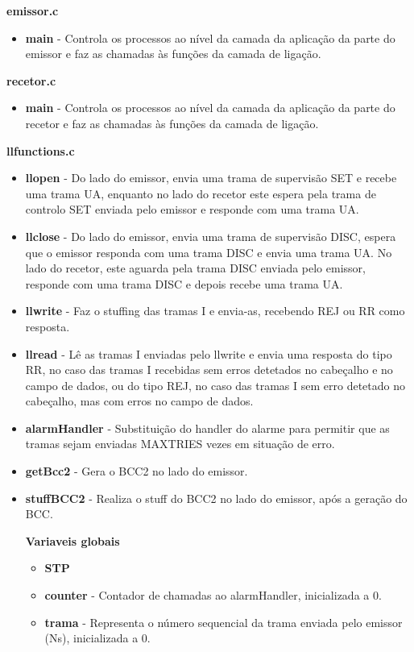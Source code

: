 \documentclass{article}
\begin{document}
\bigskip

\textbf{emissor.c}
\begin{itemize}
	\item \textbf{main} - Controla os processos ao nível da camada da aplicação da parte do emissor e faz as chamadas às funções da camada de ligação.
\end{itemize}


\bigskip

\textbf{recetor.c}
\begin{itemize}
	\item \textbf{main} - Controla os processos ao nível da camada da aplicação da parte do recetor e faz as chamadas às funções da camada de ligação.
\end{itemize}

\bigskip

\textbf{llfunctions.c}
\begin{itemize}
	\item \textbf{llopen} - Do lado do emissor, envia uma trama de supervisão SET e recebe uma trama UA, enquanto no lado do recetor este espera pela trama de controlo SET enviada pelo emissor e responde com uma trama UA.
	\item \textbf{llclose} -  Do lado do emissor, envia uma trama de supervisão DISC, espera que o emissor responda com uma trama DISC e envia uma trama UA. No lado do recetor, este aguarda pela trama DISC enviada pelo emissor, responde com uma trama DISC e depois recebe uma trama UA.
	\item \textbf{llwrite} - Faz o stuffing das tramas I e envia-as, recebendo REJ ou RR como resposta.
	\item \textbf{llread} - Lê as tramas I enviadas pelo llwrite e envia uma resposta do tipo RR, no caso das tramas I recebidas sem erros detetados no cabeçalho e no campo de dados, ou do tipo REJ, no caso das tramas I sem erro detetado no cabeçalho, mas com erros no campo de dados.
	\item \textbf{alarmHandler} - Substituição do handler do alarme para permitir que as tramas sejam enviadas MAXTRIES vezes em situação de erro.
	\item \textbf{getBcc2} - Gera o BCC2 no lado do emissor.
	\item \textbf{stuffBCC2} - Realiza o stuff do BCC2 no lado do emissor, após a geração do BCC.
	
	\textbf{Variaveis globais}
	\begin{itemize}
		\item \textbf{STP}
		\item \textbf{counter} - Contador de chamadas ao alarmHandler, inicializada a 0.
		\item \textbf{trama} - Representa o número sequencial da trama enviada pelo emissor (Ns), inicializada a 0.
	\end{itemize}
\end{itemize}
\end{document}
